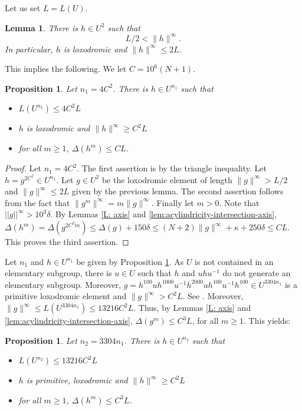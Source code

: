 \documentclass[leqno,a4paper,10pt]{amsart}
\theoremstyle{plain}
\newtheorem{prop}[thm]{Proposition}
\newtheorem{lem}[thm]{Lemma}
\theoremstyle{definition}
\theoremstyle{remark}
\renewcommand{\leq}{\leqslant}
\let\leq\leqslant
\begin{document}
Let us set $L=L(U)$. 
\begin{lem}\label{L:power-large-energy-2} There is $h\in U^{2}$  such that
 $$L/2 < \|h\|^{\infty}.$$
 In particular, $h$ is loxodromic and  $\|h\|^{\infty}\leqslant 2L$.
\end{lem}


This implies the following. We let $C=10^6(N+1)$.
\begin{prop}\label{P:long-hyperbolic-short-intersection} Let $n_1=4 C^2$. There is $h\in U^{n_1}$ such that 
\begin{itemize}
\item  $L (U^{n_1}) \leqslant 4C^2L$
\item $h$ is loxodromic and $\|h\|^{\infty}\geqslant C^2L$
\item for all $m\geqslant 1$,  $\Delta(h^m)\leqslant C L$.
\end{itemize}
\end{prop}
\begin{proof} Let $n_1=4 C^2 $. The first assertion is by the triangle inequality. Let $h=g^{2C^2} \in U^{n_1}$.  Let  $g\in U^{2}$ be the loxodromic element of length $\|g\|^{\infty}> L/2$ and $\|g\|^{\infty}\leqslant 2L$ given by the previous lemma. The second assertion follows from the fact that $\|g^m\|^{\infty}=m\|g\|^{\infty}$. Finally let $m>0$. Note that $||g||^{\infty}>10^3\delta$. By Lemmas \ref{L: axis} and \ref{lem:acylindricity-intersection-axis},   
$\Delta(h^m) =\Delta(g^{2C^2m}) \leq \Delta(g)+150\delta \leq (N+2) \|g\|^{\infty} +\kappa + 250\delta \leqslant C L.$ This proves the third assertion.
\end{proof}

Let $n_1$ and $h\in U^{n_1}$ be given by Proposition \ref{P:long-hyperbolic-short-intersection}. As $U$ is not contained in an elementary subgroup, there is $u\in U$ such that $h$ and $uhu^{-1}$ do not generate an elementary subgroup. Moreover, $g=h^{100}uh^{1000}u^{-1}h^{2000}uh^{100}u^{-1}h^{100}\in U^{3304n_1}$ is a primitive loxodromic element and $\|g\|^{\infty}>C^2L$. See \cite[Lemma 2.8]{fujiwara_rates_2021}. Moreover, $\|g\|^{\infty}\leqslant L(U^{3304n_1})\leqslant 13216 C^2L$. Thus, by Lemmas \ref{L: axis} and \ref{lem:acylindricity-intersection-axis}, $\Delta(g^m)\leqslant C^3 L$, for all $m\geqslant 1$.
  This yields:

\begin{prop}\label{P:long-primitive-short-intersection} Let $n_2=3304n_1$. There is $h\in U^{n_2}$ such that 
\begin{itemize}
\item  $L (U^{n_2}) \leqslant 13216 C^2L$
\item $h$ is primitive, loxodromic and $\|h\|^{\infty}\geqslant C^2L$
\item for all $m\geqslant 1$,  $\Delta(h^m)\leqslant C^3 L$.
\end{itemize} 
\end{prop}
\end{document}
